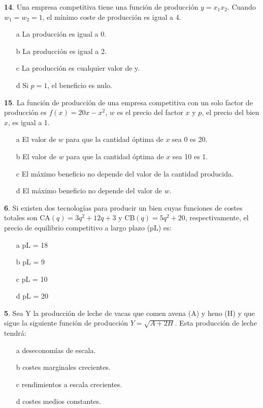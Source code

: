 \documentclass{nuevotema}
\begin{document}

\textbf{14}. Una empresa competitiva tiene una función de producción $y=x_1 x_2$. Cuando $w_1=w_2 = 1$, el mínimo coste de producción es igual a 4.

\begin{enumerate}
	\item[a] La producción es igual a 0.
	\item[b] La producción es igual a 2.
	\item[c] La producción es cualquier valor de y.
	\item[d] Si $p=1$, el beneficio es nulo.
\end{enumerate}

\textbf{15}. La función de producción de una empresa competitiva con un solo factor de producción es $f(x) = 20x - x^2$, $w$ es el precio del factor $x$ y $p$, el precio del bien $x$, es igual a 1.

\begin{enumerate}
	\item[a] El valor de $w$ para que la cantidad óptima de $x$ sea 0 es 20.
	\item[b] El valor de $w$ para que la cantidad óptima de $x$ sea 10 es 1.
	\item[c] El máximo beneficio no depende del valor de la cantidad producida.
	\item[d] El máximo beneficio no depende del valor de $w$.
\end{enumerate}

\textbf{6}. Si existen dos tecnologías para producir un bien cuyas funciones de costes totales son $\text{CA}(q) = 3q^2 + 12q +3$ y $\text{CB}(q)=5q^2 + 20$, respectivamente, el precio de equilibrio competitivo a largo plazo (pL) es:

\begin{enumerate}
	\item[a] pL = 18
	\item[b] pL = 9
	\item[c] pL = 10
	\item[d] pL = 20
\end{enumerate}


\textbf{5}. Sea Y la producción de leche de vacas que comen avena (A) y heno (H) y que sigue la siguiente función de producción $Y = \sqrt{A+2H}$. Esta producción de leche tendrá:

\begin{enumerate}
	\item[a] deseconomías de escala.
	\item[b] costes marginales crecientes.
	\item[c] rendimientos a escala crecientes.
	\item[d] costes medios constantes.
\end{enumerate}
\end{document}
